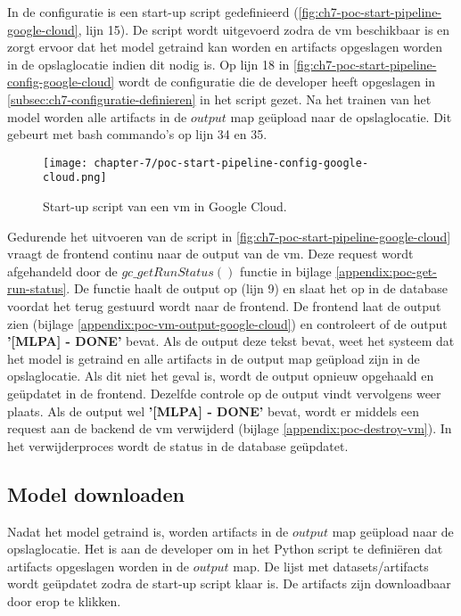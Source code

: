\newpage

In de configuratie is een start-up script gedefinieerd (\autoref{fig:ch7-poc-start-pipeline-google-cloud}, lijn 15). De script wordt uitgevoerd zodra de \acrshort{vm} beschikbaar is en zorgt ervoor dat het model getraind kan worden en \glspl{artifact} opgeslagen worden in de opslaglocatie indien dit nodig is. Op lijn 18 in \autoref{fig:ch7-poc-start-pipeline-config-google-cloud} wordt de configuratie die de developer heeft opgeslagen in \autoref{subsec:ch7-configuratie-definieren} in het script gezet. Na het trainen van het model worden alle \glspl{artifact} in de \(output\) map geüpload naar de opslaglocatie. Dit gebeurt met bash commando's op lijn 34 en 35.

\newpage

\begin{figure}[hbt!]
  \centering
  \texttt{[image: chapter-7/poc-start-pipeline-config-google-cloud.png]}
  \caption{Start-up script van een \acrfull{vm} in Google Cloud.}
  \label{fig:ch7-poc-start-pipeline-config-google-cloud}
\end{figure}

Gedurende het uitvoeren van de script in \autoref{fig:ch7-poc-start-pipeline-google-cloud} vraagt de frontend continu naar de output van de \acrshort{vm}. Deze request wordt afgehandeld door de \(gc\_getRunStatus()\) functie in bijlage \ref{appendix:poc-get-run-status}. De functie haalt de output op (lijn 9) en slaat het op in de database voordat het terug gestuurd wordt naar de frontend. De frontend laat de output zien (bijlage \ref{appendix:poc-vm-output-google-cloud}) en controleert of de output \textbf{'[MLPA] - DONE'} bevat. Als de output deze tekst bevat, weet het systeem dat het model is getraind en alle \glspl{artifact} in de output map geüpload zijn in de opslaglocatie. Als dit niet het geval is, wordt de output opnieuw opgehaald en geüpdatet in de frontend. Dezelfde controle op de output vindt vervolgens weer plaats. Als de output wel \textbf{'[MLPA] - DONE'} bevat, wordt er middels een request aan de backend de \acrshort{vm} verwijderd (bijlage \ref{appendix:poc-destroy-vm}). In het verwijderproces wordt de status in de database geüpdatet.

\subsection{Model downloaden}\label{subsec:ch7-model-downloaden}
Nadat het model getraind is, worden \glspl{artifact} in de \(output\) map geüpload naar de opslaglocatie. Het is aan de developer om in het Python script te definiëren dat artifacts opgeslagen worden in de \(output\) map. De lijst met datasets/\glspl{artifact} wordt geüpdatet zodra de start-up script klaar is. De \glspl{artifact} zijn downloadbaar door erop te klikken.

